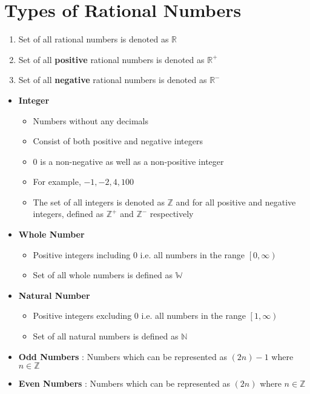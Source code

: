 \section{Types of Rational Numbers}
\begin{NOTE}
    \begin{enumerate}
        \item Set of all rational numbers is denoted as $\mathbb{R}$
        \item Set of all \textbf{positive} rational numbers is denoted as $\mathbb{R}^{+}$
        \item Set of all \textbf{negative} rational numbers is denoted as $\mathbb{R}^{-}$
    \end{enumerate}
\end{NOTE}

\begin{itemize}
    \item \textbf{Integer}
    \begin{itemize}
        \item Numbers without any decimals
        \item Consist of both positive and negative integers
        \item $0$ is a non-negative as well as a non-positive integer
        \item For example, $-1,-2,4,100$
        \item The set of all integers is denoted as $\mathbb{Z}$ and for all positive and negative integers, defined as $\mathbb{Z}^{+}$ and $\mathbb{Z}^{-}$ respectively
    \end{itemize}

    \item \textbf{Whole Number}
    \begin{itemize}
        \item Positive integers including 0 \rm{i.e.} all numbers in the range $\left[ 0, \infty \right)$
        \item Set of all whole numbers is defined as $\mathbb{W}$
    \end{itemize}

    \item \textbf{Natural Number}
    \begin{itemize}
        \item Positive integers excluding 0 \rm{i.e.} all numbers in the range $\left[ 1, \infty \right)$
        \item Set of all natural numbers is defined as $\mathbb{N}$
    \end{itemize}

    \item \textbf{Odd Numbers} : Numbers which can be represented as $(2n) - 1$ where $n \in \mathbb{Z}$

    \item \textbf{Even Numbers} : Numbers which can be represented as $(2n)$ where $n \in \mathbb{Z}$

\end{itemize}


